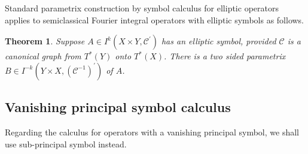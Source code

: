 \documentclass[10pt, a4paper, twoside]{amsart}
\numberwithin{equation}{section}
\newtheorem{theorem}{Theorem}
\theoremstyle{remark}
\begin{document}
\begin{appendix}
	
	 Standard parametrix construction by symbol calculus for elliptic operators applies to semiclassical Fourier integral operators with elliptic symbols as follows.
	
	\begin{theorem}Suppose $A \in I^k(X \times Y, \mathcal{C}^\prime)$ has an elliptic symbol, provided $\mathcal{C}$ is a canonical graph from $T^\ast(Y)$ onto $T^\ast(X)$. There is a two sided parametrix $B \in I^{- k}(Y \times X, (\mathcal{C}^{-1})^\prime)$ of $A$.\end{theorem}
	
	\subsection{Vanishing principal symbol calculus}
	
	Regarding the calculus for operators with a vanishing principal symbol, we shall use sub-principal symbol instead.
	

\end{appendix}
\end{document}
